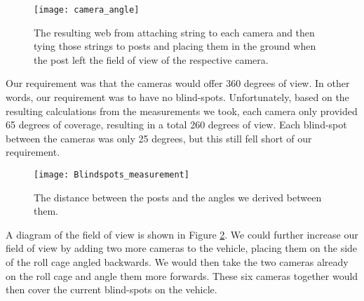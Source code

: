 \begin{figure}[H]
\centerline{\texttt{[image: camera\_angle]}}
\caption[]{The resulting web from attaching string to each camera and then tying those strings to posts and placing them in the ground when the post left the field of view of the respective camera.}
\label{fig:blindspot_verification}
\end{figure}

Our requirement was that the cameras would offer 360 degrees of view.  In other words, our requirement was to have no blind-spots.  Unfortunately, based on the resulting calculations from the measurements we took, each camera only provided 65 degrees of coverage, resulting in a total 260 degrees of view.  Each blind-spot between the cameras was only 25 degrees, but this still fell short of our requirement.

\begin{figure}[H]
\centerline{\texttt{[image: Blindspots\_measurement]}}
\caption[]{The distance between the posts and the angles we derived between them.}
\label{fig:blindspot_measurement}
\end{figure}

A diagram of the field of view is shown in Figure \ref{fig:blindspot_measurement}. We could further increase our field of view by adding two more cameras to the vehicle, placing them on the side of the roll cage angled backwards.  We would then take the two cameras already on the roll cage and angle them more forwards.  These six cameras together would then cover the current blind-spots on the vehicle.